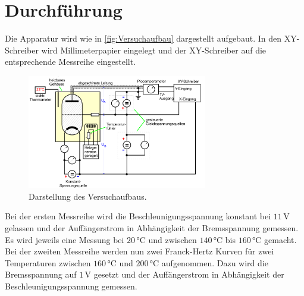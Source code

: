 \section{Durchführung}
\label{sec:Durchführung}
Die Apparatur wird wie in \autoref{fig:Versuchaufbau} dargestellt aufgebaut. In den XY-Schreiber wird
Millimeterpapier eingelegt und der XY-Schreiber auf die entsprechende Messreihe eingestellt.
\begin{figure}
    \centering
    \includegraphics[width=0.7\textwidth]{Bilder/Versuchsaufbau.png}
    \caption{Darstellung des Versuchaufbaus.}
    \label{fig:Versuchaufbau}
\end{figure}
Bei der ersten Messreihe wird die Beschleunigungsspannung konstant bei $11\,\unit{\volt}$ gelassen und der
Auffängerstrom in Abhängigkeit der Bremsspannung gemessen. Es wird jeweils eine Messung bei
$20\,\unit{\celsius}$ und zwischen $140\,\unit{\celsius}$ bis $160\,\unit{\celsius}$ gemacht. Bei der zweiten
Messreihe werden nun zwei Franck-Hertz Kurven für zwei Temperaturen zwischen $160\,\unit{\celsius}$ und
$200\,\unit{\celsius}$ aufgenommen. Dazu wird die Bremsspannung auf $1\,\unit{\volt}$ gesetzt und der
Auffängerstrom in Abhängigkeit der Beschleunigungsspannung gemessen.